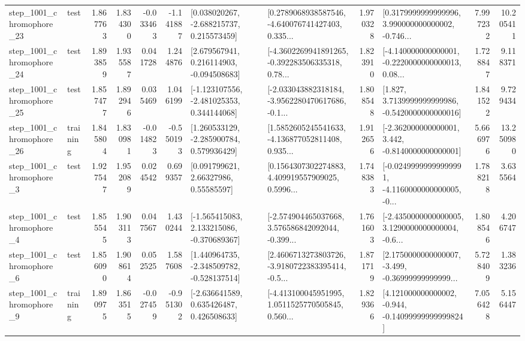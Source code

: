 \begin{tabular}{llrrrrllrlrr}
 step\_1001\_chromophore\_23 &      test &      1.867763 &    1.834300 &     -0.033463 & -1.141887 &    [0.038020267, -2.688215737, 0.215573459] &  [0.2789068938587546, -4.640076741427403, 0.335... &       1.970328 &  [0.3179999999999996, 3.990000000000002, -0.746... &            7.997232 &         10.205411 \\
 step\_1001\_chromophore\_24 &      test &      1.893859 &    1.935587 &      0.041728 &  1.244876 &    [2.679567941, 0.216114903, -0.094508683] &  [-4.3602269941891265, -0.392283506335318, 0.78... &       1.823910 &  [-4.140000000000001, -0.2220000000000013, 0.08... &            1.728847 &          9.118371 \\
 step\_1001\_chromophore\_25 &      test &      1.857477 &    1.892946 &      0.035469 &  1.046199 &   [-1.123107556, -2.481025353, 0.344144068] &  [-2.033043882318184, -3.9562280470617686, -0.1... &       1.808548 &   [1.827, 3.7139999999999986, -0.5420000000000016] &            1.841522 &          9.729434 \\
 step\_1001\_chromophore\_26 &  training &      1.845804 &    1.830981 &     -0.014823 & -0.550193 &    [1.260533129, -2.285900784, 0.579936429] &  [1.5852605245541633, -4.136877052811408, 0.935... &       1.912656 &   [-2.362000000000001, 3.442, -0.8140000000000001] &            5.666976 &         13.250980 \\
  step\_1001\_chromophore\_3 &      test &      1.927547 &    1.952089 &      0.024542 &  0.699357 &       [0.091799621, 2.66327986, 0.55585597] &  [0.1564307302274883, 4.409919557909025, 0.5996... &       1.748383 &  [-0.02499999999999991, -4.1160000000000005, -0... &            1.788218 &          3.635564 \\
  step\_1001\_chromophore\_4 &      test &      1.855545 &    1.903113 &      0.047567 &  1.430244 &   [-1.565415083, 2.133215086, -0.370689367] &  [-2.574904465037668, 3.576586842092044, -0.399... &       1.761603 &  [-2.4350000000000005, 3.1290000000000004, -0.6... &            1.808546 &          4.206747 \\
  step\_1001\_chromophore\_6 &      test &      1.856090 &    1.908614 &      0.052525 &  1.587608 &   [1.440964735, -2.348509782, -0.528137514] &  [2.4606713273803726, -3.9180722383395414, -0.5... &       1.871719 &  [2.1750000000000007, -3.499, -0.36999999999999... &            5.728409 &          1.383236 \\
  step\_1001\_chromophore\_9 &  training &      1.890975 &    1.863515 &     -0.027459 & -0.951302 &    [-2.636641589, 0.635426487, 0.426508633] &  [-4.413100045951995, 1.0511525770505845, 0.560... &       1.829366 &  [4.121000000000002, -0.944, -0.14099999999999824] &            7.056428 &          5.156447 \\

\end{tabular}
